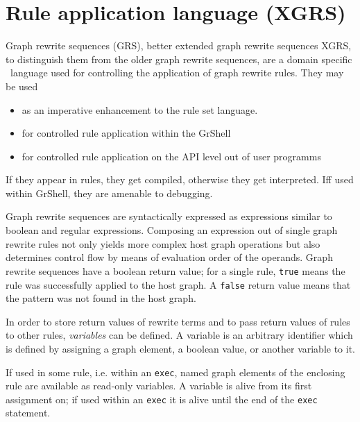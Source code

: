 \chapter{Rule application language (XGRS)}
\label{cha:xgrs}

Graph rewrite sequences (GRS), better extended graph rewrite sequences XGRS, to distinguish them from the older graph rewrite sequences, are a domain specific \GrG~language used for controlling the application of graph rewrite rules. 
They may be used
\begin{itemize}
\item as an imperative enhancement to the rule set language.
\item for controlled rule application within the GrShell
\item for controlled rule application on the API level out of user programms
\end{itemize}

If they appear in rules, they get compiled, otherwise they get interpreted.
Iff used within GrShell, they are amenable to debugging.

Graph rewrite sequences are syntactically expressed as expressions similar to boolean and regular expressions.
Composing an expression out of single graph rewrite rules not only yields more complex host graph operations but also determines control flow by means of evaluation order of the operands.
Graph rewrite sequences have a boolean return value; for a single rule, \texttt{true} means the rule was successfully applied to the host graph.
A \texttt{false} return value means that the pattern was not found in the host graph.

In order to store return values of rewrite terms and to pass return values of rules to other rules, \emph{variables} can be defined.
A variable is an arbitrary identifier which is defined by assigning a graph element, a boolean value, or another variable to it.

If used in some rule, i.e. within an \texttt{exec}, named graph elements of the enclosing rule are available as read-only variables.
A variable is alive from its first assignment on; if used within an \texttt{exec} it is alive until the end of the \texttt{exec} statement.

